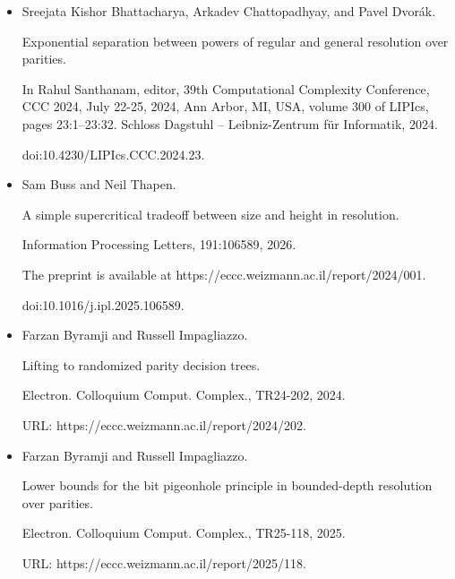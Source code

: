 \begin{itemize}
URL: https://eccc.weizmann.ac.il/report/2025/106.





\item 
[10]

Sreejata Kishor Bhattacharya, Arkadev Chattopadhyay, and Pavel Dvorák.


Exponential separation between powers of regular and general
resolution over parities.


In Rahul Santhanam, editor, 39th Computational Complexity
Conference, CCC 2024, July 22-25, 2024, Ann Arbor, MI, USA, volume 300
of LIPIcs, pages 23:1–23:32. Schloss Dagstuhl – Leibniz-Zentrum
für Informatik, 2024.


doi:10.4230/LIPIcs.CCC.2024.23.





\item 
[11]

Sam Buss and Neil Thapen.


A simple supercritical tradeoff between size and height in
resolution.


Information Processing Letters, 191:106589, 2026.


The preprint is available at
https://eccc.weizmann.ac.il/report/2024/001.


doi:10.1016/j.ipl.2025.106589.





\item 
[12]

Farzan Byramji and Russell Impagliazzo.


Lifting to randomized parity decision trees.


Electron. Colloquium Comput. Complex., TR24-202, 2024.


URL: https://eccc.weizmann.ac.il/report/2024/202.





\item 
[13]

Farzan Byramji and Russell Impagliazzo.


Lower bounds for the bit pigeonhole principle in bounded-depth
resolution over parities.


Electron. Colloquium Comput. Complex., TR25-118, 2025.


URL: https://eccc.weizmann.ac.il/report/2025/118.






\end{itemize}
